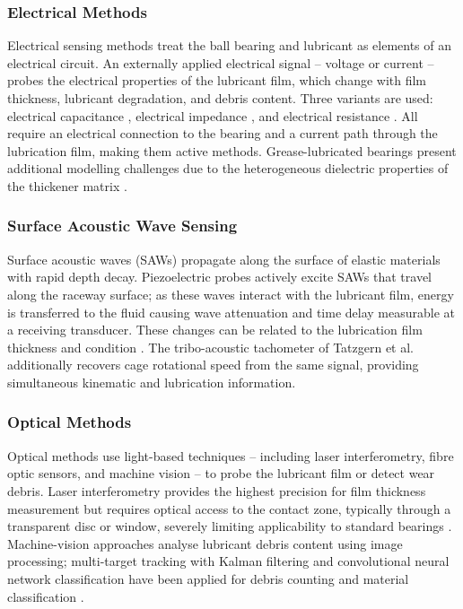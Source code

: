 \subsubsection{Electrical Methods}
\label{subsubsec:electrical}
Electrical sensing methods treat the ball bearing and lubricant as elements of an electrical circuit. An externally applied electrical signal -- voltage or current -- probes the electrical properties of the lubricant film, which change with film thickness, lubricant degradation, and debris content. Three variants are used: electrical capacitance \cite{cen_ehl_2021,dai_situ_2024}, electrical impedance \cite{becker-dombrowsky_electrical_2024,maruyama_lubrication_2023,schneider_method_2022}, and electrical resistance \cite{maruyama_lubrication_2019}. All require an electrical connection to the bearing and a current path through the lubrication film, making them active methods. Grease-lubricated bearings present additional modelling challenges due to the heterogeneous dielectric properties of the thickener matrix \cite{cojocaru_grease_2025,zhang_grease_2021}.

\subsubsection{Surface Acoustic Wave Sensing}
\label{subsubsec:saw}
Surface acoustic waves (SAWs) propagate along the surface of elastic materials with rapid depth decay. Piezoelectric probes actively excite SAWs that travel along the raceway surface; as these waves interact with the lubricant film, energy is transferred to the fluid causing wave attenuation and time delay measurable at a receiving transducer. These changes can be related to the lubrication film thickness and condition \cite{lindner_a23_2011,tatzgern_tribo-acoustic_2025,kestel_condition_2025}. The tribo-acoustic tachometer of Tatzgern et al.\ \cite{tatzgern_tribo-acoustic_2025} additionally recovers cage rotational speed from the same signal, providing simultaneous kinematic and lubrication information.

\subsubsection{Optical Methods}
\label{subsubsec:optical}
Optical methods use light-based techniques -- including laser interferometry, fibre optic sensors, and machine vision -- to probe the lubricant film or detect wear debris. Laser interferometry provides the highest precision for film thickness measurement but requires optical access to the contact zone, typically through a transparent disc or window, severely limiting applicability to standard bearings \cite{shang_comprehensive_2024}. Machine-vision approaches analyse lubricant debris content using image processing; multi-target tracking with Kalman filtering and convolutional neural network classification have been applied for debris counting and material classification \cite{liu_oil_2022,wang_online_2022}.


